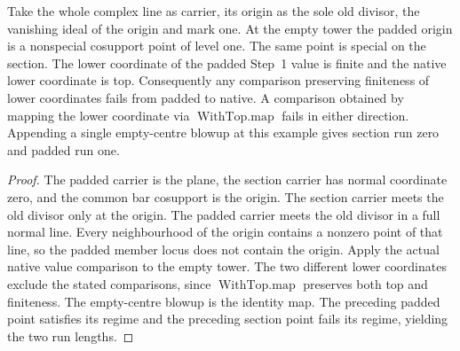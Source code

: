 \begin{theorem}
\label{hir:g1-positive-normal-special-example}
\leanok
Take the whole complex line as carrier, its origin as the sole old
divisor, the vanishing ideal of the origin and mark one. At the empty
tower the padded origin is a nonspecial cosupport point of level one.
The same point is special on the section. The lower coordinate of the
padded Step~1 value is finite and the native lower coordinate is top.
Consequently any comparison preserving finiteness of lower
coordinates fails from padded to native. A comparison obtained by
mapping the lower coordinate via $\operatorname{WithTop.map}$ fails in
either direction.
Appending a single empty-centre blowup at this example gives
section run zero and padded run one.
\end{theorem}
\begin{proof}
The padded carrier is the plane, the section carrier has normal
coordinate zero, and the common bar cosupport is the origin. The
section carrier meets the old divisor only at the origin. The padded
carrier meets the old divisor in a full normal line. Every
neighbourhood of the origin contains a nonzero point of that line,
so the padded member locus does not contain the origin. Apply the
actual native value comparison to the empty tower. The two different
lower coordinates exclude the stated comparisons, since
$\operatorname{WithTop.map}$ preserves both top and finiteness.
The empty-centre blowup is the identity map. The preceding
padded point satisfies its regime and the preceding section
point fails its regime, yielding the two run lengths.
\end{proof}

